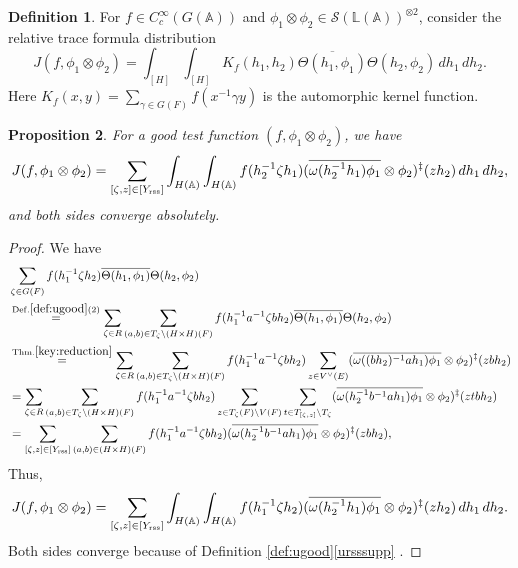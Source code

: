 \documentclass[11pt, reqno]{amsart}
\numberwithin{equation}{subsection}
\theoremstyle{plain}
\newtheorem{proposition}{Proposition}[subsection]
\theoremstyle{definition}
\newtheorem{definition}[proposition]{Definition}
\newcommand{\bs}{\backslash}
\renewcommand{\AA}{\mathbb A}
\newcommand{\LL}{\mathbb L}
\newcommand{\ol}{\overline}
\newcommand{\cS}{\mathcal S}
\newcommand{\rss}{\textnormal{rss}}
\begin{document}
\begin{definition}
For $f \in C_c^\infty(G(\AA))$ and
$\phi_1 \otimes \phi_2 \in 
\cS(\LL(\AA))^{\otimes 2}$, 
consider the relative trace formula distribution
\begin{equation}
    J(f, \phi_1 \otimes \phi_2)
    = \int_{[H]}\int_{[H]}
    K_f(h_1, h_2) \ol{\Theta(h_1, \phi_1)}
    \Theta(h_2, \phi_2)\,dh_1\,dh_2.
\end{equation}
Here $K_f(x, y)=\sum_{\gamma \in G(F)} f(x^{-1}\gamma y)$ is the automorphic kernel function.
\end{definition}




\begin{proposition} \label{prop:udecomp}
For a good test function $(f, \phi_1 \otimes \phi_2)$, we have 
\[
    J(f, \phi_1 \otimes \phi_2)= \sum_{[\zeta, z] \in [Y_\rss] 
    }
    \int_{H(\AA)}\int_{H(\AA)}
    f(h^{-1}_2 \zeta h_1)
    (\ol{\omega(h^{-1}_2h_1)\phi_1} \otimes \phi_2)^\ddagger(zh_2)\,dh_1\,dh_2,
\]
and both sides converge absolutely. 
\end{proposition}
\begin{proof}
We have
\begin{align*}
    &\sum_{\zeta \in G(F)}
    f(h_1^{-1}\zeta h_2)\ol{\Theta(h_1, \phi_1)}\Theta(h_2, \phi_2) \\
    &\overset{\mathrm{Def.} \ref{def:ugood} (2)}{=} \sum_{\zeta \in R }
    \sum_{(a, b) \in T_\zeta \bs (H\times H)(F)} 
    f(h_1^{-1}a^{-1}\zeta b h_2) \ol{\Theta(h_1, \phi_1)} \Theta(h_2, \phi_2)  \\
    &\overset{\mathrm{Thm.} \ref{key:reduction}}{=} \sum_{\zeta \in R }
    \sum_{(a, b) \in T_\zeta \bs (H\times H)(F)} 
    f(h_1^{-1}a^{-1}\zeta b h_2)
    \sum_{z \in V^\vee(E)}( \ol{\omega((bh_2)^{-1}ah_1)\phi_1} \otimes \phi_2 )^\ddagger(zbh_2)\\
    &= \sum_{\zeta \in R} 
    \sum_{(a, b)\in T_\zeta \bs (H \times H)(F)}    f(h_1^{-1}a^{-1}\zeta bh_2) 
    \sum_{z \in T_\zeta(F) \backslash V(F)}\sum_{t \in T_{[\zeta, z]} \bs T_\zeta}
    ( \ol{\omega (h^{-1}_2b^{-1}ah_1)\phi_1} \otimes \phi_2)^\ddagger(ztbh_2) \\
    &=\sum_{[\zeta, z] \in [Y_\rss]}
    \sum_{(a, b) \in (H\times H)(F)}
    f(h_1^{-1}a^{-1}\zeta bh_2)
    ( \ol{\omega(h^{-1}_2b^{-1}ah_1)\phi_1} \otimes \phi_2)^\ddagger(zbh_2),
\end{align*}
Thus,
\begin{align*}
    J(f, \phi_1 \otimes \phi_2)= \sum_{[\zeta, z] \in [Y_\rss]}
    \int_{H(\AA)}\int_{H(\AA)}
    f(h_1^{-1}\zeta h_2)
    (\ol{\omega(h^{-1}_2h_1)\phi_1} \otimes \phi_2)^\ddagger(zh_2)\,dh_1\,dh_2.
\end{align*}
Both sides converge because of Definition 
\ref{def:ugood}\eqref{ursssupp} .
\end{proof}
\end{document}
